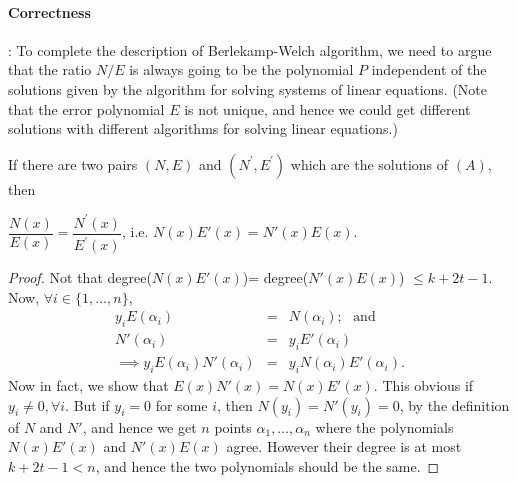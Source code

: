 \paragraph{Correctness}:
To complete the description of Berlekamp-Welch algorithm, we need to argue that  the ratio $N/E$ is always going to be the polynomial $P$  independent of the solutions given by the algorithm for solving systems of linear equations. (Note that the error polynomial $E$ is not unique, and hence we could get different solutions with different algorithms for solving linear equations.)
\begin{lemma}

If there are two pairs $(N,E)$ and $(N^{'},E^{'})$ which are the solutions of $(A)$, then
\end{lemma}
\begin{center}
$\dfrac{N(x)}{E(x)}=\dfrac{N^{'}(x)}{E^{'}(x)}$, i.e. $N(x)E'(x)= N'(x)E(x)$.
\end{center}
\begin{proof}

 Not that  degree($N(x)E'(x)$)= degree($N'(x)E(x)$) $\le k+2t-1$. Now, $\forall i\in\{1,\ldots, n\}$,
\begin{eqnarray*}
y_iE(\alpha_i) &=& N(\alpha_i); ~~~\mbox{and}\\
N'(\alpha_i) &=& y_i E'(\alpha_i)\\
\implies  y_iE(\alpha_i)N'(\alpha_i) &=& y_i N(\alpha_i)E'(\alpha_i). 
\end{eqnarray*}
Now in fact, we show that  $E(x) N'(x)= N(x) E'(x)$. This obvious if $y_i\neq 0, \forall i$. But if $y_i=0$ for some $i$, then
$N(y_i)= N'(y_i)=0$, by the definition of $N$ and $N'$, and hence we get $n$  points $\alpha_1,\ldots, \alpha_n$ where the polynomials $N(x)E'(x)$ and $N'(x)E(x)$ agree.
However their degree is at most $k+2t-1 < n$, and hence the two polynomials should be the same. 
\end{proof}


